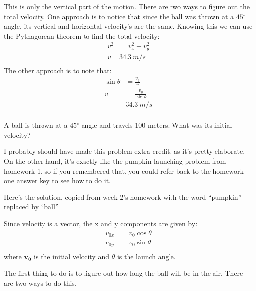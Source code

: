 \documentclass[fleqn,addpoints]{exam}
\newcommand{\degree}{\ensuremath{^\circ}}
\begin{document}
\begin{questions}
\begin{solution}
This is only the vertical part of the motion.  There are two ways to figure out the total velocity.  One approach is to
notice that since the ball was thrown at a $45 \degree$ angle, its vertical and horizontal velocity's are the same.
Knowing this we can use the Pythagorean theorem to find the total velocity:
\begin{align*}
  v^2 &= v_x^2 + v_y^2 \\
  v & 34.3 \ m/s \\
\end{align*}
The other approach is to note that:
\begin{align*}
  \sin \theta &= \frac{v_y}{v} \\
  v &= \frac{v_y}{\sin \theta} \\
    & 34.3 \ m/s \\
\end{align*}

\end{solution}

\question[5]
A ball is thrown at a $45 \degree$ angle and travels 100 meters.  What was its initial velocity?

\begin{solution}

I probably should have made this problem extra credit, as it's pretty elaborate.  On the other hand, it's exactly like
the pumpkin launching problem from homework 1, so if you remembered that, you could refer back to the homework one
answer key to see how to do it.

Here's the solution, copied from week 2's homework with the word ``pumpkin'' replaced by ``ball''

Since velocity is a vector, the x and y components are given by:
\begin{align*}
  v_{0x} &= v_0 \cos \theta \\
  v_{0y} &= v_0 \sin \theta \\
\end{align*}
where $\mathbf{v_0}$ is the initial velocity and $\theta$ is the launch angle.

The first thing to do is to figure out how long the ball will be in the air.  There are two ways to do this.


\end{solution}
\end{questions}
\end{document}
